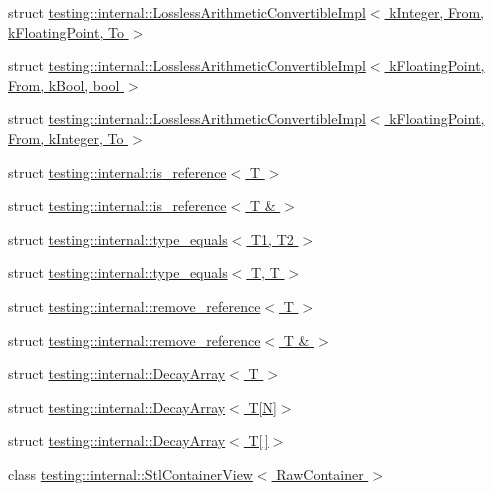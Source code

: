 \begin{DoxyCompactItemize}
struct \hyperlink{structtesting_1_1internal_1_1LosslessArithmeticConvertibleImpl_3_01kInteger_00_01From_00_01kFloatingPoint_00_01To_01_4}{testing\+::internal\+::\+Lossless\+Arithmetic\+Convertible\+Impl$<$ k\+Integer, From, k\+Floating\+Point, To $>$}
\item 
struct \hyperlink{structtesting_1_1internal_1_1LosslessArithmeticConvertibleImpl_3_01kFloatingPoint_00_01From_00_01kBool_00_01bool_01_4}{testing\+::internal\+::\+Lossless\+Arithmetic\+Convertible\+Impl$<$ k\+Floating\+Point, From, k\+Bool, bool $>$}
\item 
struct \hyperlink{structtesting_1_1internal_1_1LosslessArithmeticConvertibleImpl_3_01kFloatingPoint_00_01From_00_01kInteger_00_01To_01_4}{testing\+::internal\+::\+Lossless\+Arithmetic\+Convertible\+Impl$<$ k\+Floating\+Point, From, k\+Integer, To $>$}
\item 
struct \hyperlink{structtesting_1_1internal_1_1is__reference}{testing\+::internal\+::is\+\_\+reference$<$ T $>$}
\item 
struct \hyperlink{structtesting_1_1internal_1_1is__reference_3_01T_01_6_01_4}{testing\+::internal\+::is\+\_\+reference$<$ T \& $>$}
\item 
struct \hyperlink{structtesting_1_1internal_1_1type__equals}{testing\+::internal\+::type\+\_\+equals$<$ T1, T2 $>$}
\item 
struct \hyperlink{structtesting_1_1internal_1_1type__equals_3_01T_00_01T_01_4}{testing\+::internal\+::type\+\_\+equals$<$ T, T $>$}
\item 
struct \hyperlink{structtesting_1_1internal_1_1remove__reference}{testing\+::internal\+::remove\+\_\+reference$<$ T $>$}
\item 
struct \hyperlink{structtesting_1_1internal_1_1remove__reference_3_01T_01_6_01_4}{testing\+::internal\+::remove\+\_\+reference$<$ T \& $>$}
\item 
struct \hyperlink{structtesting_1_1internal_1_1DecayArray}{testing\+::internal\+::\+Decay\+Array$<$ T $>$}
\item 
struct \hyperlink{structtesting_1_1internal_1_1DecayArray_3_01T[N]_4}{testing\+::internal\+::\+Decay\+Array$<$ T\mbox{[}\+N\mbox{]}$>$}
\item 
struct \hyperlink{structtesting_1_1internal_1_1DecayArray_3_01T[]_4}{testing\+::internal\+::\+Decay\+Array$<$ T\mbox{[}$\,$\mbox{]}$>$}
\item 
class \hyperlink{classtesting_1_1internal_1_1StlContainerView}{testing\+::internal\+::\+Stl\+Container\+View$<$ Raw\+Container $>$}
\item 

\end{DoxyCompactItemize}
